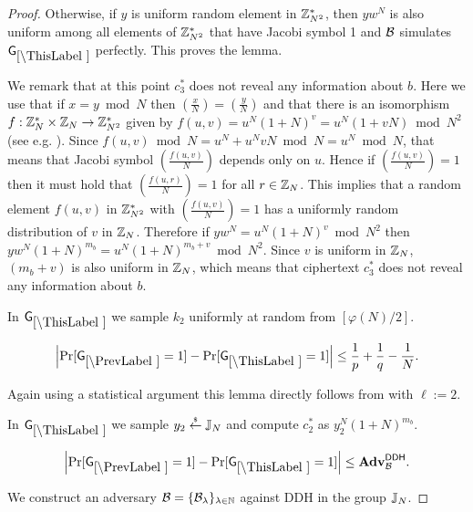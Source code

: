 \begin{proof}
Otherwise, if $y$ is uniform random element in $\mathbb{Z}_{N^2}^*$, then $yw^N$ is also uniform among all elements of $\mathbb{Z}_{N^2}^*$ that have Jacobi symbol 1 and $\mathcal{B}$ simulates $\games_\thisgame$ perfectly. This proves the lemma.

We remark that at this point $c_3^*$ does not reveal any information about $b$. Here we use that if $x = y \bmod N$ then $\left( \frac{x}{N} \right)= \left( \frac{y}{N} \right)$ and that there is an isomorphism $f:\mathbb{Z}_N^* \times \mathbb{Z}_N \rightarrow\mathbb{Z}_{N^2}^*$ given by $f(u,v)=u^N(1+N)^v = u^N(1+vN) \bmod N^2$ (see e.g. \cite[Proposition 13.6]{books/crc/KatzLindell2014}).  Since $f(u,v) \bmod N = u^N + u^NvN \bmod N = u^N \bmod N$, that means that Jacobi symbol $\left( \frac{f(u,v)}{N} \right)$ depends only on $u$. Hence if $\left( \frac{f(u,v)}{N} \right) = 1$ then it must hold that $\left( \frac{f(u,r)}{N} \right) = 1$ for all $r \in \mathbb{Z}_N$. This implies that a random element $f(u,v)$ in $\mathbb{Z}_{N^2}^*$ with $\left( \frac{f(u,v)}{N} \right) = 1$ has a uniformly random distribution of $v$ in $\mathbb{Z}_N$. Therefore if $yw^N = u^N(1+N)^v \bmod N^2$ then  $yw^N(1+N)^{m_b}  = u^N(1+N)^{m_b+v} \bmod N^2$. Since $v$ is uniform in $\mathbb{Z}_N$, $(m_b + v)$ is also uniform in $\mathbb{Z}_N$, which means that ciphertext $c_3^*$ does not reveal any information about $b$. 

In $\games_\thisgame$ we sample $k_2$ uniformly at random from $[\varphi(N)/2]$. 

\begin{lemma}
\[
\left|\Pr[\games_\prevgame = 1] - \Pr[\games_\thisgame = 1]\right| \leq \frac{1}{p}+\frac{1}{q}-\frac{1}{N}.
\]
\end{lemma}

Again using a statistical argument this lemma directly follows from  with $\ell:=2$.

In $\games_\thisgame$ we sample $y_2 \stackrel{{\scriptscriptstyle\$}}{\leftarrow} \mathbb{J}_N$ and compute $c_2^*$ as  $y_2^N(1+N)^{m_b}$. 

\begin{lemma}\label{lem:ddh-rom-lh}
\[
\left|\Pr[\games_\prevgame = 1] - \Pr[\games_\thisgame = 1]\right| \leq \advtg_\advB^\ddh.
\]
\end{lemma}
We construct an adversary $\mathcal{B} = \{\mathcal{B}_{\lambda}\}_{\lambda \in \mathbb{N}}$ against DDH in the group $\mathbb{J}_N$. %


\end{proof}
